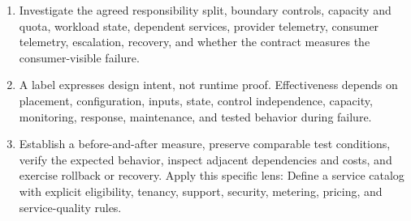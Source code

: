 \documentclass[11pt]{article}
\begin{document}
\begin{enumerate}
\item Investigate the agreed responsibility split, boundary controls, capacity and quota, workload state, dependent services, provider telemetry, consumer telemetry, escalation, recovery, and whether the contract measures the consumer-visible failure.
\item A label expresses design intent, not runtime proof. Effectiveness depends on placement, configuration, inputs, state, control independence, capacity, monitoring, response, maintenance, and tested behavior during failure.
\item Establish a before-and-after measure, preserve comparable test conditions, verify the expected behavior, inspect adjacent dependencies and costs, and exercise rollback or recovery. Apply this specific lens: Define a service catalog with explicit eligibility, tenancy, support, security, metering, pricing, and service-quality rules.
\end{enumerate}
\end{document}
